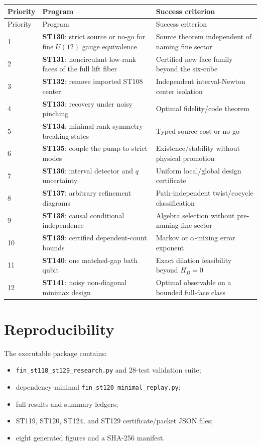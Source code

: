 \documentclass[11pt,a4paper]{article}
\begin{document}
\small
\begin{longtable}{@{}p{}p{}p{}@{}}
\toprule Priority & Program & Success criterion\\\midrule\endfirsthead
\toprule Priority & Program & Success criterion\\\midrule\endhead
1 & \textbf{ST130}: strict source or no-go for fine $U(12)$ gauge equivalence & Source theorem independent of naming fine sector\\
2 & \textbf{ST131}: noncirculant low-rank faces of the full lift fiber & Certified new face family beyond the six-cube\\
3 & \textbf{ST132}: remove imported ST108 center & Independent interval-Newton center isolation\\
4 & \textbf{ST133}: recovery under noisy pinching & Optimal fidelity/code theorem\\
5 & \textbf{ST134}: minimal-rank symmetry-breaking states & Typed source cost or no-go\\
6 & \textbf{ST135}: couple the pump to strict modes & Existence/stability without physical promotion\\
7 & \textbf{ST136}: interval detector and $q$ uncertainty & Uniform local/global design certificate\\
8 & \textbf{ST137}: arbitrary refinement diagrams & Path-independent twist/cocycle classification\\
9 & \textbf{ST138}: causal conditional independence & Algebra selection without pre-naming fine sector\\
10 & \textbf{ST139}: certified dependent-count bounds & Markov or $\alpha$-mixing error exponent\\
11 & \textbf{ST140}: one matched-gap bath qubit & Exact dilation feasibility beyond $H_B=0$\\
12 & \textbf{ST141}: noisy non-diagonal minimax design & Optimal observable on a bounded full-face class\\
\bottomrule
\end{longtable}
\normalsize

\section{Reproducibility}

The executable package contains:
\begin{itemize}
\item \texttt{fin\_st118\_st129\_research.py} and 28-test validation suite;
\item dependency-minimal \texttt{fin\_st120\_minimal\_replay.py};
\item full results and summary ledgers;
\item ST119, ST120, ST124, and ST129 certificate/packet JSON files;
\item eight generated figures and a SHA-256 manifest.
\end{itemize}
\end{document}

